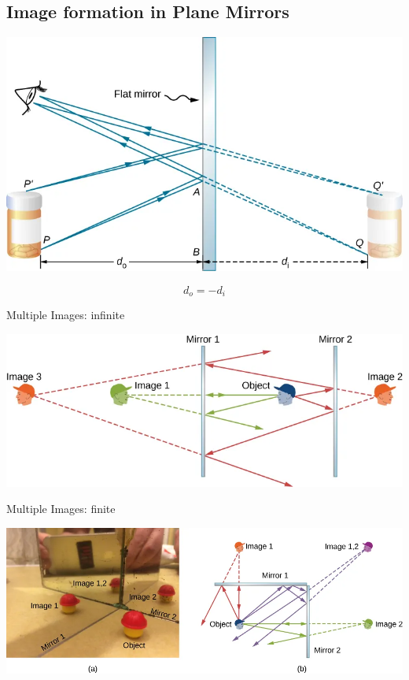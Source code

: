 \documentclass{beamer}
\begin{document}
\subsection{Image formation in Plane Mirrors}
\begin{frame}
	\begin{center}
		\includegraphics[scale=0.3]{37.png}
	\end{center}
	\begin{displaymath}
		d_{o} = -d_{i} 
	\end{displaymath}
\end{frame}
\begin{frame}{Multiple Images: infinite }
	\begin{center}
		\includegraphics[scale=0.4]{38.png}
	\end{center}
\end{frame}
\begin{frame}{Multiple Images: finite }
	\begin{center}
		\includegraphics[scale=0.3]{39.png}
	\end{center}
\end{frame}
\end{document}

